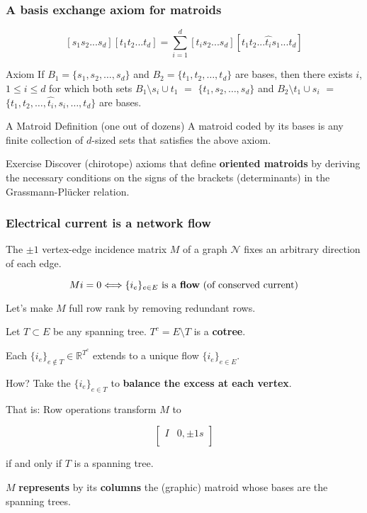 \documentclass{beamer}
\newcommand{\Reals}{\ensuremath{\mathbb{R}}}
\begin{document}
\begin{frame}
\frametitle{A basis exchange axiom for matroids}

\[
[s_1 s_2 ... s_d][t_1 t_2 ... t_d] = 
\sum_{i=1}^d [t_i s_2 ... s_d][t_1 t_2 ... \hat{t_i} s_1 ... t_d]
\]

\begin{block}{Axiom}
If $B_1= \{s_1, s_2, \ldots, s_d\}$ and 
$B_2= \{t_1, t_2, \ldots, t_d\}$ are bases, 
then
there exists
$i$, $1 \le i \le d$ for which both sets
$B_1\setminus s_i \cup t_1$ $=$ 
$\{t_1, s_2, \ldots,  s_d\}$ 
and 
$B_2 \setminus t_1 \cup s_i$ $=$ 
$\{t_1, t_2, \ldots, \hat{t_i}, s_i, \ldots, t_d\}$ 
are bases.
\end{block}

\begin{block}{A Matroid Definition (one out of dozens)}
A matroid coded by its bases is any 
finite collection of $d$-sized sets that satisfies the
above axiom.
\end{block}

\begin{block}{Exercise}
Discover (chirotope) axioms that define \textbf{oriented matroids} by 
deriving the necessary conditions on the signs of the 
brackets (determinants) in the Grassmann-Pl\"{u}cker
relation.
\end{block}

\end{frame}


\begin{frame}[fragile]
\frametitle{Electrical current is a network flow}

The $\pm 1$ vertex-edge incidence matrix $M$
of a graph $\mathcal{N}$ fixes 
an arbitrary direction of each edge.

\[
Mi=0 \Longleftrightarrow \{i_e\}_{e\in E} \text{ is a \textbf{flow} (of conserved
current)}
\]

Let's make $M$ full row rank by removing redundant rows.

Let $T\subset E$ be any spanning tree.  $T^c = E\setminus T$ is a 
\textbf{cotree}.

Each $\{i_e\}_{e\not\in T} \in \Reals^{T^c}$ extends to a unique flow 
$\{i_e\}_{e\in E}$. 

How?  Take the $\{i_e\}_{e\in T}$ to \textbf{balance
the excess at each vertex}.

That is: Row operations transform $M$ to 

\[
\left[
\begin{array}{c|c}
 I & 0,\pm 1 s \\
\end{array}
\right]
\]

\begin{center}
if and only if $T$ is a spanning tree.
\end{center}

$M$ \textbf{represents} by its \textbf{columns} the (graphic) 
matroid whose bases are the spanning trees.

\end{frame}
\end{document}
